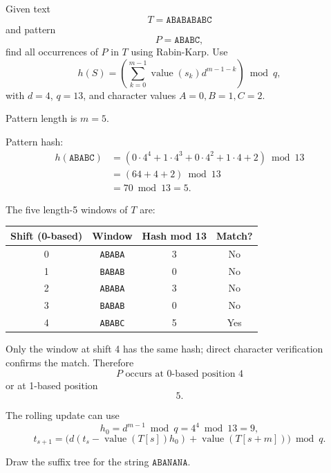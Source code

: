 \documentclass[11pt,a4paper]{article}
\begin{document}
\begin{qaquestion}
Given text
\[
T=\texttt{ABABABABC}
\]
and pattern
\[
P=\texttt{ABABC},
\]
find all occurrences of \(P\) in \(T\) using Rabin-Karp. Use
\[
h(S)=\left(\sum_{k=0}^{m-1}\operatorname{value}(s_k)d^{m-1-k}\right)\bmod q,
\]
with \(d=4\), \(q=13\), and character values \(A=0,B=1,C=2\).
\end{qaquestion}

\begin{qaanswer}[Answer 6(b)]
Pattern length is \(m=5\).

Pattern hash:
\[
\begin{aligned}
h(\texttt{ABABC})
&=(0\cdot4^4+1\cdot4^3+0\cdot4^2+1\cdot4+2)\bmod13\\
&=(64+4+2)\bmod13\\
&=70\bmod13=\boxed{5}.
\end{aligned}
\]

The five length-5 windows of \(T\) are:

\begin{center}
\begin{tabular}{c c c c}
\toprule
Shift (0-based) & Window & Hash mod 13 & Match?\\
\midrule
0 & \texttt{ABABA} & 3 & No\\
1 & \texttt{BABAB} & 0 & No\\
2 & \texttt{ABABA} & 3 & No\\
3 & \texttt{BABAB} & 0 & No\\
4 & \texttt{ABABC} & 5 & Yes\\
\bottomrule
\end{tabular}
\end{center}

Only the window at shift 4 has the same hash; direct character verification confirms the match. Therefore
\[
\boxed{P\text{ occurs at 0-based position }4}
\]
or at 1-based position
\[
\boxed{5}.
\]

The rolling update can use
\[
h_0=d^{m-1}\bmod q=4^4\bmod13=9,
\]
\[
t_{s+1}=\bigl(d(t_s-\operatorname{value}(T[s])h_0)+\operatorname{value}(T[s+m])\bigr)\bmod q.
\]
\end{qaanswer}

\begin{qaquestion}
Draw the suffix tree for the string \(\texttt{ABANANA}\).
\end{qaquestion}
\end{document}
